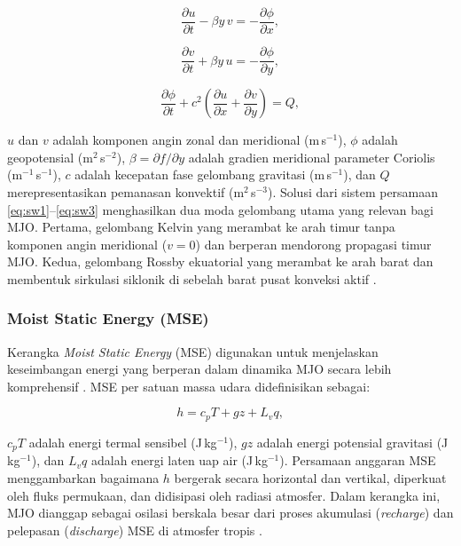\documentclass[12pt,a4paper]{report}
\begin{document}
\begin{equation}
  \frac{\partial u}{\partial t} - \beta y\,v
  = -\frac{\partial \phi}{\partial x},
  \label{eq:sw1}
\end{equation}
 
\begin{equation}
  \frac{\partial v}{\partial t} + \beta y\,u
  = -\frac{\partial \phi}{\partial y},
  \label{eq:sw2}
\end{equation}
 
\begin{equation}
  \frac{\partial \phi}{\partial t}
  + c^2\!\left(\frac{\partial u}{\partial x}
  + \frac{\partial v}{\partial y}\right) = Q,
  \label{eq:sw3}
\end{equation}
 
\noindent
$u$ dan $v$ adalah komponen angin zonal dan meridional
(m\,s$^{-1}$), $\phi$ adalah geopotensial (m$^2$\,s$^{-2}$), $\beta =
\partial f / \partial y$ adalah gradien meridional parameter Coriolis
(m$^{-1}$\,s$^{-1}$), $c$ adalah kecepatan fase gelombang gravitasi
(m\,s$^{-1}$), dan $Q$ merepresentasikan pemanasan konvektif
(m$^2$\,s$^{-3}$). Solusi dari sistem persamaan \eqref{eq:sw1}--\eqref{eq:sw3}
menghasilkan dua moda gelombang utama yang relevan bagi MJO. Pertama,
gelombang Kelvin yang merambat ke arah timur tanpa komponen angin
meridional ($v = 0$) dan berperan mendorong propagasi timur MJO. Kedua,
gelombang Rossby ekuatorial yang merambat ke arah barat dan
membentuk sirkulasi siklonik di sebelah barat pusat konveksi aktif
\cite{matsuno1966, kiladis2009}.
 
\subsubsection{Moist Static Energy (MSE)}
 
Kerangka \textit{Moist Static Energy} (MSE) digunakan untuk menjelaskan keseimbangan energi yang berperan dalam dinamika MJO secara lebih komprehensif \cite{raymond2009}. MSE per satuan massa udara didefinisikan sebagai:
 
\begin{equation}
  h = c_p T + gz + L_v q,
  \label{eq:mse}
\end{equation}
 
\noindent
$c_p T$ adalah energi termal sensibel (J\,kg$^{-1}$), $gz$ adalah
energi potensial gravitasi (J\,kg$^{-1}$), dan $L_v q$ adalah energi laten
uap air (J\,kg$^{-1}$). Persamaan anggaran MSE menggambarkan bagaimana $h$ bergerak
secara horizontal dan vertikal, diperkuat oleh fluks permukaan, dan
didisipasi oleh radiasi atmosfer. Dalam kerangka ini, MJO dianggap sebagai
osilasi berskala besar dari proses akumulasi (\textit{recharge}) dan
pelepasan (\textit{discharge}) MSE di atmosfer tropis \cite{sobel2013,
raymond2009}.
\end{document}
